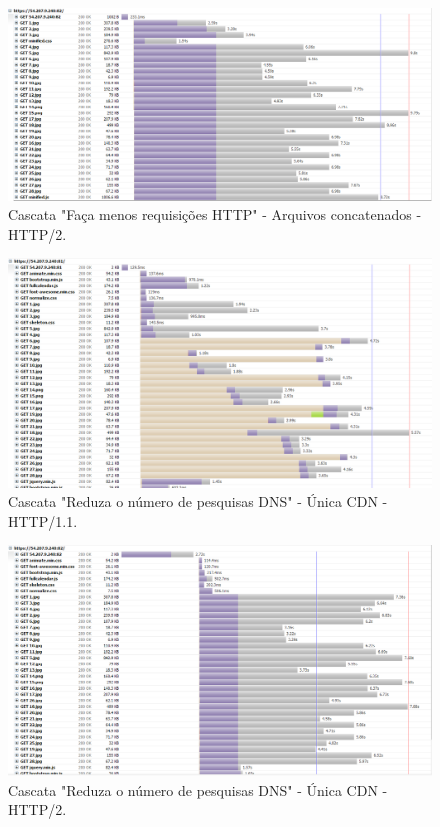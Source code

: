 \begin{figure}[!htb]
    \centering
    \caption{Cascata "Faça menos requisições HTTP" - Arquivos concatenados - HTTP/2.}
    \includegraphics[width=1.0\textwidth]{./04-figuras/cascatas/concatenado_http2}
\end{figure}

\begin{figure}[!htb]
    \centering
    \caption{Cascata "Reduza o número de pesquisas DNS" - Única CDN - HTTP/1.1.}
    \includegraphics[width=1.0\textwidth]{./04-figuras/cascatas/single_http11}
\end{figure}

\begin{figure}[!htb]
    \centering
    \caption{Cascata "Reduza o número de pesquisas DNS" - Única CDN - HTTP/2.}
    \includegraphics[width=1.0\textwidth]{./04-figuras/cascatas/single_http2}
\end{figure}

